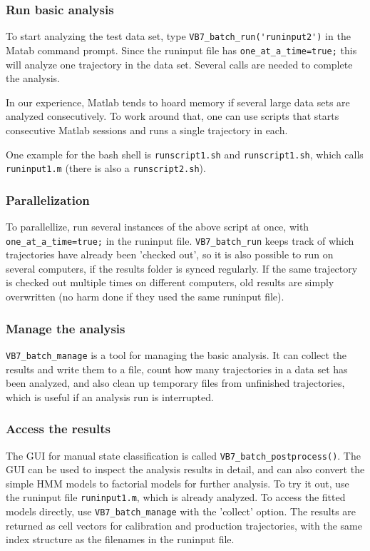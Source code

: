 \subsubsection*{Run basic analysis}
To start analyzing the test data set, type
\verb+VB7_batch_run('runinput2')+ in the Matab command prompt. Since
the runinput file has \verb+one_at_a_time=true;+ this will analyze one
trajectory in the data set. Several calls are needed to complete the
analysis. 

In our experience, Matlab tends to hoard memory if several large data
sets are analyzed consecutively.  To work around that, one can use
scripts that starts consecutive Matlab sessions and runs a single
trajectory in each.

One example for the bash shell is \verb+runscript1.sh+ and
\verb+runscript1.sh+, which calls \verb+runinput1.m+ (there is also a
\verb+runscript2.sh+).

\subsubsection*{Parallelization}
To parallellize, run several instances of the above script at once,
with \verb+one_at_a_time=true;+ in the runinput
file. \verb+VB7_batch_run+ keeps track of which trajectories have
already been 'checked out', so it is also possible to run on several
computers, if the results folder is synced regularly. If the same
trajectory is checked out multiple times on different computers, old
results are simply overwritten (no harm done if they used the same
runinput file).

\subsubsection*{Manage the analysis}
\verb+VB7_batch_manage+ is a tool for managing the basic analysis. It
can collect the results and write them to a file, count how many
trajectories in a data set has been analyzed, and also clean up
temporary files from unfinished trajectories, which is useful if an
analysis run is interrupted.

\subsubsection*{Access the results} 
The GUI for manual state classification is called
\verb+VB7_batch_postprocess()+. The GUI can be used to inspect the
analysis results in detail, and can also convert the simple HMM models
to factorial models for further analysis. To try it out, use the
runinput file \verb+runinput1.m+, which is already analyzed. To access
the fitted models directly, use \verb+VB7_batch_manage+ with the
'collect' option. The results are returned as cell vectors for
calibration and production trajectories, with the same index structure
as the filenames in the runinput file.

